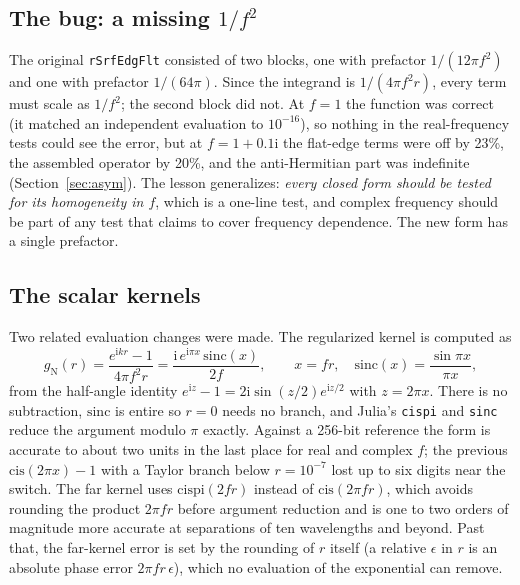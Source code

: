 \documentclass[11pt]{article}
\theoremstyle{remark}
\newcommand{\ii}{\mathrm{i}}
\newcommand{\code}[1]{\texttt{#1}}
\begin{document}
\subsection{The bug: a missing $1/f^2$}
\label{sec:bug}

The original \code{rSrfEdgFlt} consisted of two blocks, one with prefactor
$1/(12\pi f^2)$ and one with prefactor $1/(64\pi)$. Since the integrand is
$1/(4\pi f^2 r)$, every term must scale as $1/f^2$; the second block did not. At
$f = 1$ the function was correct (it matched an independent evaluation to
$10^{-16}$), so nothing in the real-frequency tests could see the error, but at
$f = 1 + 0.1\ii$ the flat-edge terms were off by 23\%, the assembled operator by
20\%, and the anti-Hermitian part was indefinite (Section~\ref{sec:asym}). The
lesson generalizes: \emph{every closed form should be tested for its homogeneity in
$f$}, which is a one-line test, and complex frequency should be part of any test that
claims to cover frequency dependence. The new form has a single prefactor.

\subsection{The scalar kernels}
\label{sec:kernels}

Two related evaluation changes were made. The regularized kernel is computed as
\begin{equation}
g_{\mathrm{N}}(r) = \frac{e^{\ii k r}-1}{4\pi f^2 r}
= \frac{\ii\,e^{\ii\pi x}\,\mathrm{sinc}(x)}{2f},\qquad x = f r,\quad \mathrm{sinc}(x) = \frac{\sin\pi x}{\pi x},
\end{equation}
from the half-angle identity $e^{\ii z}-1 = 2\ii\sin(z/2)e^{\ii z/2}$ with $z = 2\pi x$.
There is no subtraction, $\mathrm{sinc}$ is entire so $r = 0$ needs no branch, and
Julia's \code{cispi} and \code{sinc} reduce the argument modulo $\pi$ exactly. Against
a 256-bit reference the form is accurate to about two units in the last place for
real and complex $f$; the previous $\mathrm{cis}(2\pi x) - 1$ with a Taylor branch below
$r = 10^{-7}$ lost up to six digits near the switch. The far kernel uses
$\mathrm{cispi}(2fr)$ instead of $\mathrm{cis}(2\pi f r)$, which avoids rounding the
product $2\pi f r$ before argument reduction and is one to two orders of magnitude
more accurate at separations of ten wavelengths and beyond. Past that, the far-kernel
error is set by the rounding of $r$ itself (a relative $\epsilon$ in $r$ is an
absolute phase error $2\pi f r\,\epsilon$), which no evaluation of the exponential can
remove.
\end{document}
